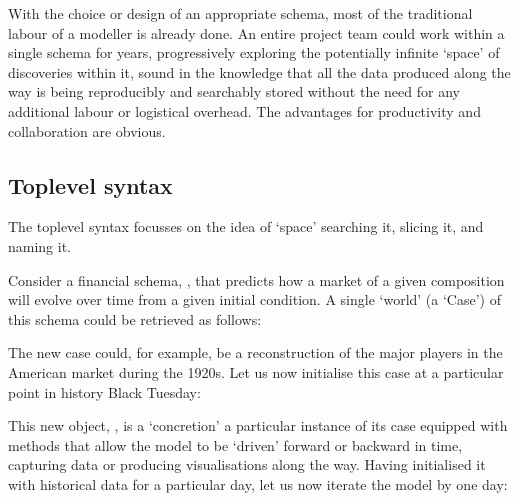 \documentclass[letterpaper,10pt,english]{jupyterBook}
\begin{document}
\sphinxAtStartPar
With the choice or design of an appropriate schema, most of the traditional labour of a modeller is already done. An entire project team could work within a single schema for years, progressively exploring the potentially infinite ‘space’ of discoveries within it, sound in the knowledge that all the data produced along the way is being reproducibly and searchably stored without the need for any additional labour or logistical overhead. The advantages for productivity and collaboration are obvious.


\subsection{Top\sphinxhyphen{}level syntax}
\label{\detokenize{content/chapter_03_everest/framework:top-level-syntax}}
\sphinxAtStartPar
The  top\sphinxhyphen{}level syntax focusses on the idea of ‘space’ \sphinxhyphen{} searching it, slicing it, and naming it.

\sphinxAtStartPar
Consider a financial schema, , that predicts how a market of a given composition will evolve over time from a given initial condition. A single ‘world’ (a ‘Case’) of this schema could be retrieved as follows:

\begin{sphinxVerbatim}[commandchars=\\\{\}]
  
\end{sphinxVerbatim}

\sphinxAtStartPar
The new case  could, for example, be a reconstruction of the major players in the American market during the 1920s. Let us now initialise this case at a particular point in history \sphinxhyphen{} Black Tuesday:

\begin{sphinxVerbatim}[commandchars=\\\{\}]
  
\end{sphinxVerbatim}

\sphinxAtStartPar
This new object, , is a ‘concretion’ \sphinxhyphen{} a particular instance of its case \sphinxhyphen{} equipped with methods that allow the model to be ‘driven’ forward or backward in time, capturing data or producing visualisations along the way. Having initialised it with historical data for a particular day, let us now iterate the model by one day:
\end{document}
